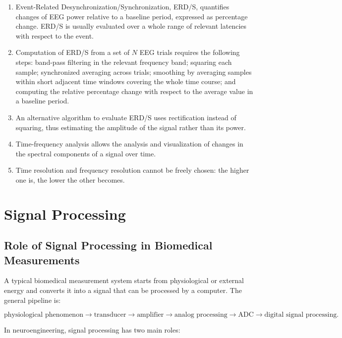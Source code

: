 \begin{enumerate}[label=\arabic*.]
    \item Event-Related Desynchronization/Synchronization, ERD/S, quantifies changes of EEG power relative to a baseline period, expressed as percentage change. ERD/S is usually evaluated over a whole range of relevant latencies with respect to the event.
    
    \item Computation of ERD/S from a set of $N$ EEG trials requires the following steps: band-pass filtering in the relevant frequency band; squaring each sample; synchronized averaging across trials; smoothing by averaging samples within short adjacent time windows covering the whole time course; and computing the relative percentage change with respect to the average value in a baseline period.
    
    \item An alternative algorithm to evaluate ERD/S uses rectification instead of squaring, thus estimating the amplitude of the signal rather than its power.
    
    \item Time-frequency analysis allows the analysis and visualization of changes in the spectral components of a signal over time.
    
    \item Time resolution and frequency resolution cannot be freely chosen: the higher one is, the lower the other becomes.
\end{enumerate}

\section{Signal Processing}

\subsection{Role of Signal Processing in Biomedical Measurements}

A typical biomedical measurement system starts from physiological or external energy and converts it into a signal that can be processed by a computer. The general pipeline is:

\[
\text{physiological phenomenon}
\rightarrow
\text{transducer}
\rightarrow
\text{amplifier}
\rightarrow
\text{analog processing}
\rightarrow
\text{ADC}
\rightarrow
\text{digital signal processing}.
\]

In neuroengineering, signal processing has two main roles:

